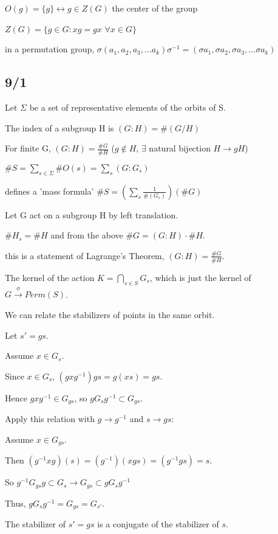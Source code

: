\documentclass[12pt]{article}
\newcommand{\inv}{^{-1}}
\begin{document}
$O(g) = \{g\} \leftrightarrow g \in Z(G)$ the center of the group

$Z(G) = \{g \in G : xg = gx$ $\forall x \in G\}$

in a permutation group, $\sigma (a_1, a_2, a_3, ... a_k) \sigma^{-1} = (\sigma a_1, \sigma a_2, \sigma a_3, ... \sigma a_k)$

\subsection{9/1}

\noindent
Let $\Sigma$ be a set of representative elements of the orbits of S.

The index of a subgroup H is $(G : H) = \#(G/H)$

For finite G, $(G:H) = \frac{\#G}{\#H}$ ($g \not \in H$, $\exists$ natural bijection $H \to gH$)

$\#S = \sum_{s \in \Sigma}\#O(s) = \sum_s(G:G_s)$

defines a 'mass formula' $\#S = (\sum_s\frac{1}{\#(G_s)})(\#G)$

\noindent
Let G act on a subgroup H by left translation.

$\#H_s = \#H$ and from the above $\#G = (G:H) \cdot \#H$. 

this is a statement of Lagrange's Theorem, $(G:H) = \frac{\#G}{\#H}$.

\noindent
The kernel of the action $K = \bigcap_{s \in S}G_s$, which is just the kernel of $G \xrightarrow{\phi} Perm(S)$.

\noindent
We can relate the stabilizers of points in the same orbit.

Let $s' = gs$.

Assume $x \in G_s$.  

Since $x \in G_s$, $(gxg^{-1})gs = g(xs) = gs$.

Hence $gxg^{-1} \in G_{gs}$, so $gG_sg^{-1} \subset G_{gs}$.

Apply this relation with $g \to g^{-1}$ and $s \to gs$:

Assume $x \in G_{gs}$.

Then $(g\inv xg)(s) = (g\inv)(xgs) = (g\inv gs) = s$.

So $g\inv G_{gs}g \subset G_s \to G_{gs} \subset gG_sg\inv$

\noindent
Thus, $gG_sg\inv = G_{gs} = G_{s'}$.

The stabilizer of $s'=gs$ is a conjugate of the stabilizer of $s$.\\
\end{document}
